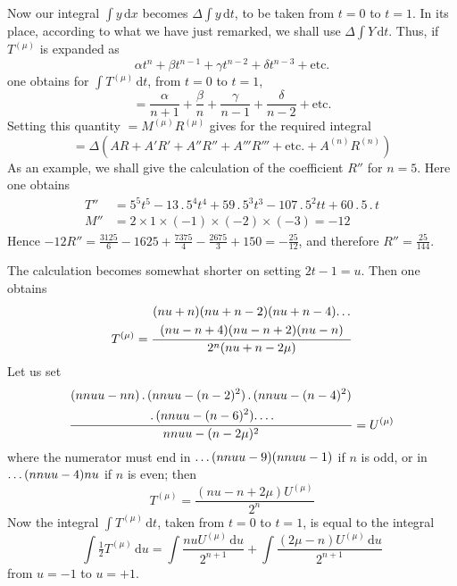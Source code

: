 Now our integral $\int y\,\mathrm{d}x$ becomes $\Delta\int y\,\mathrm{d}t$, to be taken from $t=0$ to $t=1$. In its place, according to what we have just remarked, we shall use $\Delta\int Y\,\mathrm{d}t$. Thus, if $T^{(\mu)}$ is expanded as
\[
\alpha t^n+\beta t^{n-1}+\gamma t^{n-2}+\delta t^{n-3}+\text{etc.}
\]
one obtains for $\int T^{(\mu)}\,\mathrm{d}t$, from $t=0$ to $t=1$,
\[
=\frac{\alpha}{n+1}+\frac{\beta}{n}+\frac{\gamma}{n-1}+\frac{\delta}{n-2}+\text{etc.}
\]
Setting this quantity $=M^{(\mu)}R^{(\mu)}$ gives for the required integral
\[
=\Delta(AR+A'R'+A''R''+A'''R'''+\text{etc.}+A^{(n)}R^{(n)})
\]
As an example, we shall give the calculation of the coefficient $R''$ for $n=5$. Here one obtains
\[
\begin{aligned}
T''&=5^5t^5-13\, .\,5^4t^4+59\, .\,5^3t^3-107\, .\,5^2tt+60\, .\,5\, .\,t\\[5pt]
M''&=2\times1\times(-1)\times(-2)\times(-3)=-12
\end{aligned}
\]
Hence $-12R''=\allowbreak \frac{3125}{6}-1625+\allowbreak \frac{7375}{4}-\frac{2675}{3}+\allowbreak 150=\allowbreak -\frac{25}{12}$, and therefore $R''=\frac{25}{144}$.

The calculation becomes somewhat shorter on setting $2t-1=u$. Then one obtains
\[
T^{(\mu)}=\frac{\begin{gathered}(nu+n)(nu+n-2)(nu+n-4)\ldotp\ldotp\ldotp\\(nu-n+4)(nu-n+2)(nu-n)\end{gathered}}{2^n(nu+n-2\mu)}
\]
Let us set
\[
\frac{\begin{gathered}(nnuu-nn)\, .\,(nnuu-(n-2)^2)\, .\,(nnuu-(n-4)^2)\\\, .\,(nnuu-(n-6)^2)\ldotp\ldotp\ldotp\ldotp\end{gathered}}{nnuu-(n-2\mu)^2}=U^{(\mu)}
\]
where the numerator must end in $\ldotp\ldotp\ldotp(nnuu-9)(nnuu-1)$ if $n$ is odd, or in $\ldotp\ldotp\ldotp(nnuu-4)nu$ if $n$ is even; then
\[
T^{(\mu)}=\frac{(nu-n+2\mu)U^{(\mu)}}{2^n}
\]
Now the integral $\int T^{(\mu)}\,\mathrm{d}t$, taken from $t=0$ to $t=1$, is equal to the integral
\[
\int\tfrac12 T^{(\mu)}\,\mathrm{d}u=\int\frac{nuU^{(\mu)}\,\mathrm{d}u}{2^{n+1}}+\int\frac{(2\mu-n)U^{(\mu)}\,\mathrm{d}u}{2^{n+1}}
\]
from $u=-1$ to $u=+1$.

